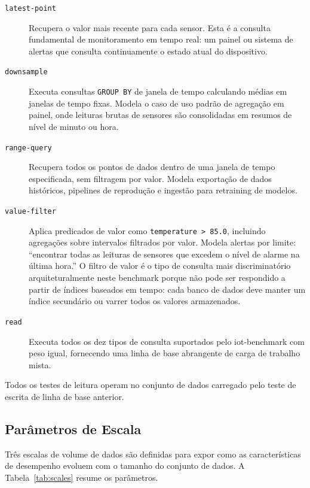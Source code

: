 \begin{description}
  \item[\texttt{latest-point}] Recupera o valor mais recente para cada sensor. Esta é a consulta
    fundamental de monitoramento em tempo real: um painel ou sistema de alertas que consulta
    continuamente o estado atual do dispositivo.

  \item[\texttt{downsample}] Executa consultas \texttt{GROUP~BY} de janela de tempo calculando
    médias em janelas de tempo fixas. Modela o caso de uso padrão de agregação em painel, onde
    leituras brutas de sensores são consolidadas em resumos de nível de minuto ou hora.

  \item[\texttt{range-query}] Recupera todos os pontos de dados dentro de uma janela de tempo
    especificada, sem filtragem por valor. Modela exportação de dados históricos, pipelines de
    reprodução e ingestão para retraining de modelos.

  \item[\texttt{value-filter}] Aplica predicados de valor como \texttt{temperature~>~85.0},
    incluindo agregações sobre intervalos filtrados por valor. Modela alertas por limite:
    ``encontrar todas as leituras de sensores que excedem o nível de alarme na última hora.''
    O filtro de valor é o tipo de consulta mais discriminatório arquiteturalmente neste benchmark
    porque não pode ser respondido a partir de índices baseados em tempo: cada banco de dados
    deve manter um índice secundário ou varrer todos os valores armazenados.

  \item[\texttt{read}] Executa todos os dez tipos de consulta suportados pelo iot-benchmark
    com peso igual, fornecendo uma linha de base abrangente de carga de trabalho mista.
\end{description}

Todos os testes de leitura operam no conjunto de dados carregado pelo teste de escrita de
linha de base anterior.

\subsection{Parâmetros de Escala}
\label{sec:scale-params}

Três escalas de volume de dados são definidas para expor como as características de desempenho
evoluem com o tamanho do conjunto de dados. A Tabela~\ref{tab:scales} resume os parâmetros.

